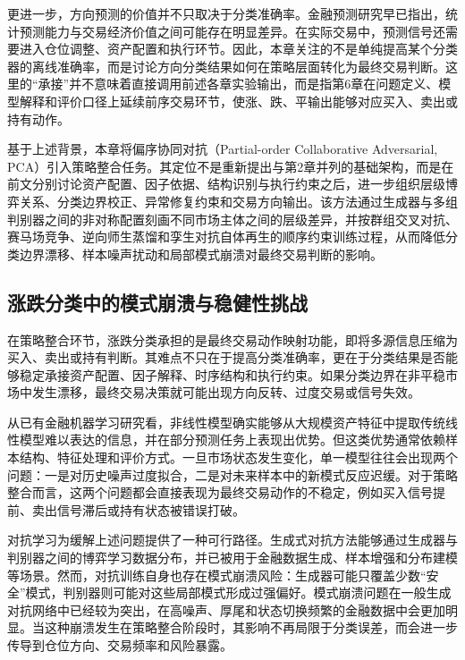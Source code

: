 更进一步，方向预测的价值并不只取决于分类准确率。金融预测研究早已指出，统计预测能力与交易经济价值之间可能存在明显差异\cite{leitch1991economic}。在实际交易中，预测信号还需要进入仓位调整、资产配置和执行环节。因此，本章关注的不是单纯提高某个分类器的离线准确率，而是讨论方向分类结果如何在策略层面转化为最终交易判断。这里的“承接”并不意味着直接调用前述各章实验输出，而是指第6章在问题定义、模型解释和评价口径上延续前序交易环节，使涨、跌、平输出能够对应买入、卖出或持有动作。

基于上述背景，本章将偏序协同对抗（Partial-order Collaborative Adversarial, PCA）引入策略整合任务。其定位不是重新提出与第2章并列的基础架构，而是在前文分别讨论资产配置、因子依据、结构识别与执行约束之后，进一步组织层级博弈关系、分类边界校正、异常修复约束和交易方向输出。该方法通过生成器与多组判别器之间的非对称配置刻画不同市场主体之间的层级差异，并按群组交叉对抗、赛马场竞争、逆向师生蒸馏和孪生对抗自体再生的顺序约束训练过程，从而降低分类边界漂移、样本噪声扰动和局部模式崩溃对最终交易判断的影响。


\subsection{涨跌分类中的模式崩溃与稳健性挑战}

在策略整合环节，涨跌分类承担的是最终交易动作映射功能，即将多源信息压缩为买入、卖出或持有判断。其难点不只在于提高分类准确率，更在于分类结果是否能够稳定承接资产配置、因子解释、时序结构和执行约束。如果分类边界在非平稳市场中发生漂移，最终交易决策就可能出现方向反转、过度交易或信号失效。

从已有金融机器学习研究看，非线性模型确实能够从大规模资产特征中提取传统线性模型难以表达的信息，并在部分预测任务上表现出优势\cite{gu2020empirical}。但这类优势通常依赖样本结构、特征处理和评价方式。一旦市场状态发生变化，单一模型往往会出现两个问题：一是对历史噪声过度拟合，二是对未来样本中的新模式反应迟缓。对于策略整合而言，这两个问题都会直接表现为最终交易动作的不稳定，例如买入信号提前、卖出信号滞后或持有状态被错误打破。

对抗学习为缓解上述问题提供了一种可行路径。生成式对抗方法能够通过生成器与判别器之间的博弈学习数据分布，并已被用于金融数据生成、样本增强和分布建模等场景\cite{cui20241gan}。然而，对抗训练自身也存在模式崩溃风险：生成器可能只覆盖少数“安全”模式，判别器则可能对这些局部模式形成过强偏好。模式崩溃问题在一般生成对抗网络中已经较为突出，在高噪声、厚尾和状态切换频繁的金融数据中会更加明显\cite{barsha2024review}。当这种崩溃发生在策略整合阶段时，其影响不再局限于分类误差，而会进一步传导到仓位方向、交易频率和风险暴露。


